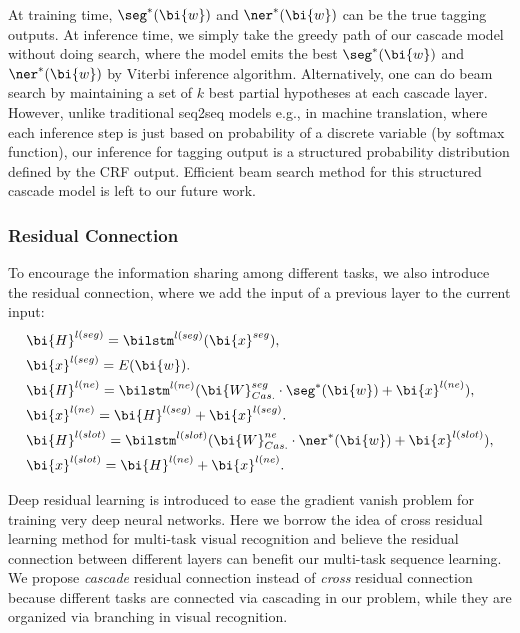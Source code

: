 At training time, $\seg^*(\bi{w})$ and $\ner^*(\bi{w})$ can be the 
true tagging outputs.
At inference time, we simply take the greedy path of our cascade model 
without doing search, where the model emits the
best $\seg^*(\bi{w})$ and $\ner^*(\bi{w})$ by Viterbi inference algorithm.
Alternatively, one can do beam search \cite{sutskever2014sequence,vinyals2015show} by maintaining a set of $k$ best partial hypotheses at each cascade layer.
However, unlike traditional seq2seq models e.g., in machine translation,
where each inference step is just based on probability of a discrete variable 
(by softmax function), our inference for tagging output is a 
structured probability distribution defined by the CRF output.
Efficient beam search method for this structured cascade model is 
left to our future work.

\subsubsection{Residual Connection}
To encourage the information sharing among different tasks,
we also introduce the residual connection,
where we add the input of a previous layer to the current input:
\begin{eqnarray*}
	& \bi{H}^{l(seg)}=\bilstm^{l(seg)}(\bi{x}^{seg}), \\
	& \bi{x}^{l(seg)}=E(\bi{w}). \\
	& \bi{H}^{l(ne)}= \bilstm^{l(ne)}(\bi{W}_{Cas.}^{seg}\cdot \seg^*(\bi{w})+\bi{x}^{l(ne)}), \\
	& \bi{x}^{l(ne)}= \bi{H}^{l(seg)}+\bi{x}^{l(seg)}. \\
	& \bi{H}^{l(slot)}= \bilstm^{l(slot)}(\bi{W}_{Cas.}^{ne}\cdot \ner^*(\bi{w})+\bi{x}^{l(slot)}), \\
	& \bi{x}^{l(slot)}= \bi{H}^{l(ne)}+\bi{x}^{l(ne)}.
\end{eqnarray*}

Deep residual learning \cite{he2016deep} is introduced to ease the gradient vanish problem for training very deep neural networks.
Here we borrow the idea of cross residual learning method for multi-task visual recognition\cite{jou2016deep}
and believe the residual connection between different layers can benefit our multi-task sequence learning.
We propose \emph{cascade} residual connection instead of \emph{cross} residual connection
because different tasks are connected via cascading in our problem, while they are organized via branching in visual recognition.



